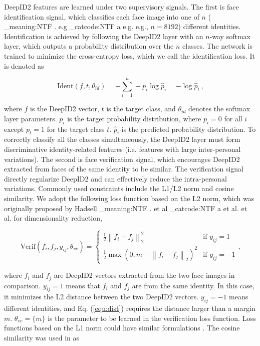 \documentclass{article} %
\makeatletter
\newcommand\latinabbrev[1]{
  \peek_meaning:NTF . {%
    #1\@}%
  { \peek_catcode:NTF a {%
      #1.\@ }%
    {#1.\@}}}
\def\eg{\latinabbrev{e.g}}
\def\etal{\latinabbrev{et al}}
\makeatother
\begin{document}
DeepID2 features are learned under two supervisory signals. The first is face identification signal, which classifies each face image into one of $n$ (\eg, $n=8192$) different identities. Identification is achieved by following the DeepID2 layer with an $n$-way softmax layer, which outputs a probability distribution over the $n$ classes. The network is trained to minimize the cross-entropy loss, which we call the identification loss. It is denoted as

\begin{equation}
\textrm{Ident}(f,t,\theta_{id})=-\sum_{i=1}^n -p_i\log \hat{p}_i=-\log\hat{p}_t \ \textrm{,}
\end{equation}

where $f$ is the DeepID2 vector, $t$ is the target class, and $\theta_{id}$ denotes the softmax layer parameters. $p_i$ is the target probability distribution, where $p_i=0$ for all $i$ except $p_t=1$ for the target class $t$. $\hat{p}_i$ is the predicted probability distribution. To correctly classify all the classes simultaneously, the DeepID2 layer must form discriminative identity-related features (i.e. features with large inter-personal variations).
The second is face verification signal, which encourages DeepID2 extracted from faces of the same identity to be similar. The verification signal directly regularize DeepID2 and can effectively reduce the intra-personal variations. Commonly used constraints include the L1/L2 norm and cosine similarity. We adopt the following loss function based on the L2 norm, which was originally proposed by Hadsell \etal \cite{hadsell2006} for dimensionality reduction,

\begin{equation}
\textrm{Verif}(f_i,f_j,y_{ij},\theta_{ve})=\left\{
\begin{array}{ll}
\frac{1}{2}\left\|f_i-f_j\right\|_2^2 & \textrm{if $y_{ij}=1$} \\
\frac{1}{2}\max\left(0, m - \left\|f_i-f_j\right\|_2\right)^2 & \textrm{if $y_{ij}=-1$}
\end{array}
\right. \textrm{,}
\label{equ:dist}
\end{equation}

where $f_i$ and $f_j$ are DeepID2 vectors extracted from the two face images in comparison. $y_{ij}=1$ means that $f_i$ and $f_j$ are from the same identity. In this case, it minimizes the L2 distance between the two DeepID2 vectors. $y_{ij}=-1$ means different identities, and Eq. (\ref{equ:dist}) requires the distance larger than a margin $m$. $\theta_{ve}=\{m\}$ is the parameter to be learned in the verification loss function. Loss functions based on the L1 norm could have similar formulations \cite{mobahi2009}. The cosine similarity was used in \cite{nair2010} as
\end{document}
